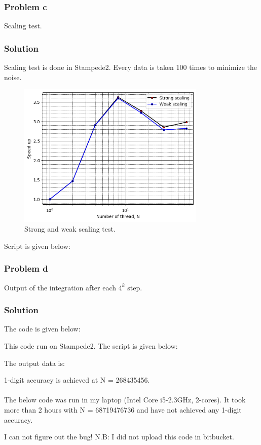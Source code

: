 \documentclass{article}
\begin{document}
\subsubsection*{Problem c}
Scaling test.
\subsubsection*{Solution}
Scaling test is done in Stampede2. Every data is taken 100 times to minimize the noise.
\begin{figure}[h!]
  \centering
    \includegraphics[width=0.8\textwidth]{3_c_scaling}
    \caption{Strong and weak scaling test.} 
    \label{t1a}
\end{figure}
Script is given below: 

\subsubsection*{Problem d}
Output of the integration after each $4^k$ step.
\subsubsection*{Solution}
The code is given below: 

This code run on Stampede2. The script is given below: 

The output data is:

1-digit accuracy is achieved at N = 268435456. 
\\
\\
The below code was run in my laptop (Intel Core i5-2.3GHz, 2-cores). It took more than 2 hours with N = 68719476736 and have not achieved any 1-digit accuracy. 



I can not figure out the bug! N.B: I did not upload this code in bitbucket. 
\end{document}
